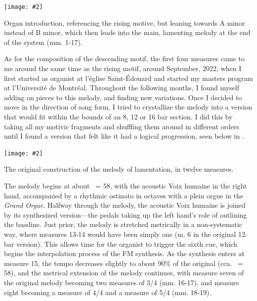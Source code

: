 \documentclass[12pt,twoside,maitrise]{dms_ks}
\newcommand{\customincludeexamples}[4][]{%
    \begin{example}[H]
        \centering
        \texttt{[image: \#2]}
        \caption{#4}
	\label{#3} 
    \end{example}
}
\theoremstyle{definition}
\begin{document}
{\customincludeexamples[width=\textwidth]{3e_2}{ex:3e_2}{Organ introduction, referencing the rising motive, but leaning towards A minor instead of B minor, which then leads into the main, lamenting melody at the end of the system (mm. 1-17).}

As for the composition of the descending motif, the first four measures came to me around the same time as the rising motif, around September, 2022, when I first started as organist at l'église Saint-Édouard and started my masters program at l'Université de Montréal.  
Throughout the following months, I found myself adding on pieces to this melody, and finding new variations.  
Once I decided to move in the direction of song form, I tried to crystallize the melody into a version that would fit within the bounds of an 8, 12 or 16 bar section. 
I did this by taking all my motivic fragments and shuffling them around in different orders until I found a version that felt like it had a logical progression, seen below in .  

\customincludeexamples[scale=0.6]{3e_3}{ex:3e_3}{The original construction of the melody of lamentation, in twelve measures.}

The melody begins at about \musQuarter\ = 58, with the acoustic Voix humaine in the right hand, accompanied by a rhythmic ostinato in octaves with a plein orgue in the \textit{Grand Orgue}. 
Halfway through the melody, the acoustic Voix humaine is joined by its synthesized version---the pedals taking up the left hand's role of outlining the bassline. 
Just prior, the melody is stretched metrically in a non-systematic way, where measures 13-14 would have been simply one (m. 6 in the original 12-bar version). 
This allows time for the organist to trigger the sixth cue, which begins the interpolation process of the FM synthesis. 
As the synthesis enters at measure 15, the tempo decreases slightly to about 90\% of the original (cca. \musQuarter\ = 58), and the metrical extension of the melody continues, with measure seven of the original melody becoming two measures of 3/4 (mm. 16-17), and measure eight becoming a measure of 4/4 and a measure of 5/4 (mm. 18-19). 

}
\end{document}
